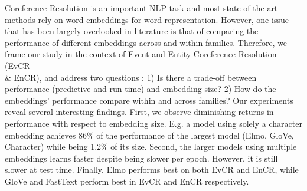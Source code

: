 Coreference Resolution is an important NLP task and most state-of-the-art methods rely on word embeddings for word representation. However, one issue that has been largely overlooked in literature is that of comparing  the performance of different embeddings across and within families. Therefore, we frame our study in the context of Event and Entity Coreference Resolution (EvCR \\& EnCR), and address two questions   : 1) Is there a trade-off between performance (predictive and run-time) and embedding size? 2) How do the embeddings' performance compare within and across families? Our experiments reveal several interesting findings. First, we observe diminishing returns in performance with respect to embedding size. E.g. a model using solely a character embedding achieves 86\% of the performance of the largest model (Elmo, GloVe, Character) while being 1.2\% of its size. Second, the larger models using multiple embeddings learns faster despite being slower per epoch. However, it is still slower at test time. Finally, Elmo performs best on both EvCR and EnCR, while GloVe and FastText perform best in EvCR and EnCR respectively.
